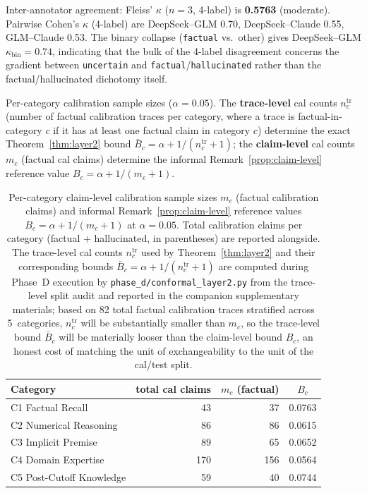 \documentclass[runningheads]{llncs}
\begin{document}
Inter-annotator agreement: Fleiss' $\kappa$ ($n=3$, 4-label) is
\textbf{0.5763} (moderate). Pairwise Cohen's $\kappa$ (4-label) are
DeepSeek--GLM 0.70, DeepSeek--Claude 0.55, GLM--Claude 0.53. The binary
collapse (\texttt{factual} vs.\ other) gives DeepSeek--GLM
$\kappa_\text{bin} = 0.74$, indicating that the bulk of the 4-label
disagreement concerns the gradient between \texttt{uncertain} and
\texttt{factual}/\texttt{hallucinated} rather than the
factual/hallucinated dichotomy itself.

Per-category calibration sample sizes ($\alpha = 0.05$). The
\textbf{trace-level} cal counts $n_c^{\text{tr}}$ (number of factual
calibration traces per category, where a trace is factual-in-category $c$
if it has at least one factual claim in category $c$) determine the exact
Theorem~\ref{thm:layer2} bound $\bar{B}_c = \alpha + 1/(n_c^{\text{tr}}+1)$;
the \textbf{claim-level} cal counts $m_c$ (factual cal claims) determine
the informal Remark~\ref{prop:claim-level} reference value
$B_c = \alpha + 1/(m_c+1)$.

\begin{table}[ht]
\centering
\caption{Per-category claim-level calibration sample sizes $m_c$ (factual
calibration claims) and informal Remark~\ref{prop:claim-level}
reference values $B_c = \alpha + 1/(m_c+1)$ at $\alpha = 0.05$. Total calibration
claims per category (factual + hallucinated, in parentheses) are reported
alongside. The trace-level cal counts $n_c^{\text{tr}}$ used by
Theorem~\ref{thm:layer2} and their corresponding bounds
$\bar{B}_c = \alpha + 1/(n_c^{\text{tr}}+1)$ are computed during Phase~D
execution by \texttt{phase\_d/conformal\_layer2.py} from the trace-level
split audit and reported in the companion supplementary materials; based
on 82 total factual calibration traces stratified across 5~categories,
$n_c^{\text{tr}}$ will be substantially smaller than $m_c$, so the
trace-level bound $\bar{B}_c$ will be materially looser than the
claim-level bound $B_c$, an honest cost of matching the unit of
exchangeability to the unit of the cal/test split.}
\label{tab:cal-counts-bounds}
\begin{tabular}{lrrc}
\hline
Category & total cal claims & $m_c$ (factual) & $B_c$ \\
\hline
C1 Factual Recall              & 43  & 37  & 0.0763 \\
C2 Numerical Reasoning         & 86  & 86  & 0.0615 \\
C3 Implicit Premise            & 89  & 65  & 0.0652 \\
C4 Domain Expertise            & 170 & 156 & 0.0564 \\
C5 Post-Cutoff Knowledge       & 59  & 40  & 0.0744 \\
\hline
\end{tabular}
\end{table}
\end{document}

